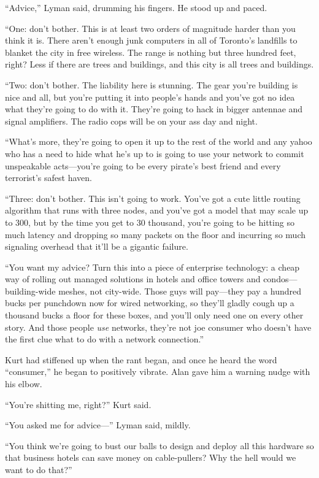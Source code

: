\documentclass{article}
\begin{document}
``Advice,'' Lyman said, drumming his fingers.  He stood up and paced.

``One:  don't bother.  This is at least two orders of magnitude harder
than you think it is.  There aren't enough junk computers in all of
Toronto's landfills to blanket the city in free wireless.  The range
is nothing but three hundred feet, right?  Less if there are trees and
buildings, and this city is all trees and buildings.

``Two:  don't bother.  The liability here is stunning.  The gear
you're building is nice and all, but you're putting it into people's
hands and you've got no idea what they're going to do with it. 
They're going to hack in bigger antennae and signal amplifiers.  The
radio cops will be on your ass day and night.

``What's more, they're going to open it up to the rest of the world
and any yahoo who has a need to hide what he's up to is going to use
your network to commit unspeakable acts---you're going to be every
pirate's best friend and every terrorist's safest haven.

``Three:  don't bother.  This isn't going to work.  You've got a cute
little routing algorithm that runs with three nodes, and you've got a
model that may scale up to 300, but by the time you get to 30
thousand, you're going to be hitting so much latency and dropping so
many packets on the floor and incurring so much signaling overhead
that it'll be a gigantic failure.

``You want my advice?  Turn this into a piece of enterprise
technology:  a cheap way of rolling out managed solutions in hotels
and office towers and condos---building-wide meshes, not city-wide. 
Those guys will pay---they pay a hundred bucks per punchdown now for
wired networking, so they'll gladly cough up a thousand bucks a floor
for these boxes, and you'll only need one on every other story.  And
those people \textit{use} networks, they're not joe consumer who
doesn't have the first clue what to do with a network connection.''

Kurt had stiffened up when the rant began, and once he heard the word
``consumer,'' he began to positively vibrate.  Alan gave him a warning
nudge with his elbow.

``You're shitting me, right?'' Kurt said.

``You asked me for advice---'' Lyman said, mildly.

``You think we're going to bust our balls to design and deploy all
this hardware so that business hotels can save money on cable-pullers? 
Why the hell would we want to do that?''
\end{document}
